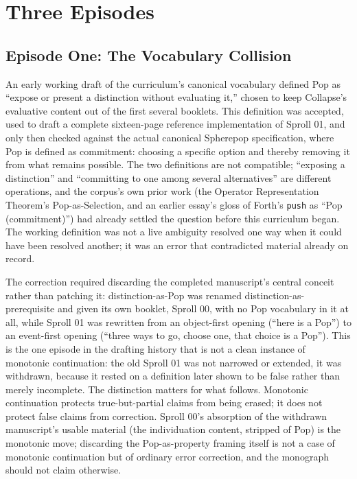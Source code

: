 \documentclass[11pt,twoside]{book}
\begin{document}
\chapter{Three Episodes}

\section{Episode One: The Vocabulary Collision}

An early working draft of the curriculum's canonical vocabulary defined Pop as ``expose or present a distinction without evaluating it,'' chosen to keep Collapse's evaluative content out of the first several booklets. This definition was accepted, used to draft a complete sixteen-page reference implementation of Sproll 01, and only then checked against the actual canonical Spherepop specification, where Pop is defined as commitment: choosing a specific option and thereby removing it from what remains possible. The two definitions are not compatible; ``exposing a distinction'' and ``committing to one among several alternatives'' are different operations, and the corpus's own prior work (the Operator Representation Theorem's Pop-as-Selection, and an earlier essay's gloss of Forth's \texttt{push} as ``Pop (commitment)'') had already settled the question before this curriculum began. The working definition was not a live ambiguity resolved one way when it could have been resolved another; it was an error that contradicted material already on record.

The correction required discarding the completed manuscript's central conceit rather than patching it: distinction-as-Pop was renamed distinction-as-prerequisite and given its own booklet, Sproll 00, with no Pop vocabulary in it at all, while Sproll 01 was rewritten from an object-first opening (``here is a Pop'') to an event-first opening (``three ways to go, choose one, that choice is a Pop''). This is the one episode in the drafting history that is not a clean instance of monotonic continuation: the old Sproll 01 was not narrowed or extended, it was withdrawn, because it rested on a definition later shown to be false rather than merely incomplete. The distinction matters for what follows. Monotonic continuation protects true-but-partial claims from being erased; it does not protect false claims from correction. Sproll 00's absorption of the withdrawn manuscript's usable material (the individuation content, stripped of Pop) is the monotonic move; discarding the Pop-as-property framing itself is not a case of monotonic continuation but of ordinary error correction, and the monograph should not claim otherwise.
\end{document}
